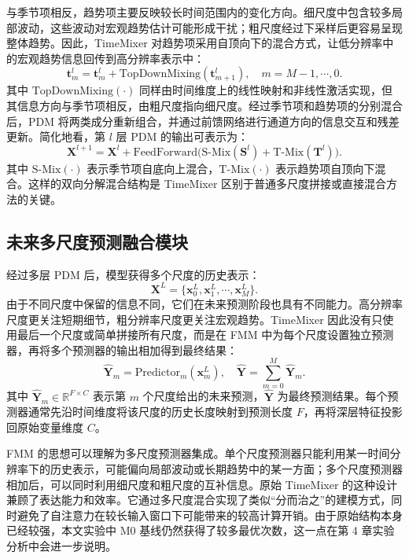 与季节项相反，趋势项主要反映较长时间范围内的变化方向。细尺度中包含较多局部波动，这些波动对宏观趋势估计可能形成干扰；粗尺度经过下采样后更容易呈现整体趋势。因此，TimeMixer 对趋势项采用自顶向下的混合方式，让低分辨率中的宏观趋势信息回传到高分辨率表示中：
\begin{equation}
    \mathbf{t}_m^{l}=\mathbf{t}_m^{l}+\mathrm{TopDownMixing}(\mathbf{t}_{m+1}^{l}),\quad m=M-1,\cdots,0.
\end{equation}
其中 $\mathrm{TopDownMixing}(\cdot)$ 同样由时间维度上的线性映射和非线性激活实现，但其信息方向与季节项相反，由粗尺度指向细尺度。经过季节项和趋势项的分别混合后，PDM 将两类成分重新组合，并通过前馈网络进行通道方向的信息交互和残差更新。简化地看，第 $l$ 层 PDM 的输出可表示为：
\begin{equation}
    \mathbf{X}^{l+1}=\mathbf{X}^{l}+\mathrm{FeedForward}\big(\mathrm{S\mbox{-}Mix}(\mathbf{S}^{l})+\mathrm{T\mbox{-}Mix}(\mathbf{T}^{l})\big).
\end{equation}
其中 $\mathrm{S\mbox{-}Mix}(\cdot)$ 表示季节项自底向上混合，$\mathrm{T\mbox{-}Mix}(\cdot)$ 表示趋势项自顶向下混合。这样的双向分解混合结构是 TimeMixer 区别于普通多尺度拼接或直接混合方法的关键。

\subsection{未来多尺度预测融合模块}

经过多层 PDM 后，模型获得多个尺度的历史表示：
\begin{equation}
    \mathbf{X}^{L}=\{\mathbf{x}_0^{L},\mathbf{x}_1^{L},\cdots,\mathbf{x}_M^{L}\}.
\end{equation}
由于不同尺度中保留的信息不同，它们在未来预测阶段也具有不同能力。高分辨率尺度更关注短期细节，粗分辨率尺度更关注宏观趋势。TimeMixer 因此没有只使用最后一个尺度或简单拼接所有尺度，而是在 FMM 中为每个尺度设置独立预测器，再将多个预测器的输出相加得到最终结果：
\begin{equation}
    \hat{\mathbf{Y}}_m=\mathrm{Predictor}_m(\mathbf{x}_m^{L}),\quad
    \hat{\mathbf{Y}}=\sum_{m=0}^{M}\hat{\mathbf{Y}}_m.
\end{equation}
其中 $\hat{\mathbf{Y}}_m\in\mathbb{R}^{F\times C}$ 表示第 $m$ 个尺度给出的未来预测，$\hat{\mathbf{Y}}$ 为最终预测结果。每个预测器通常先沿时间维度将该尺度的历史长度映射到预测长度 $F$，再将深层特征投影回原始变量维度 $C$。

FMM 的思想可以理解为多尺度预测器集成。单个尺度预测器只能利用某一时间分辨率下的历史表示，可能偏向局部波动或长期趋势中的某一方面；多个尺度预测器相加后，可以同时利用细尺度和粗尺度的互补信息。原始 TimeMixer 的这种设计兼顾了表达能力和效率。它通过多尺度混合实现了类似“分而治之”的建模方式，同时避免了自注意力在较长输入窗口下可能带来的较高计算开销。由于原始结构本身已经较强，本文实验中 M0 基线仍然获得了较多最优次数，这一点在第 4 章实验分析中会进一步说明。


